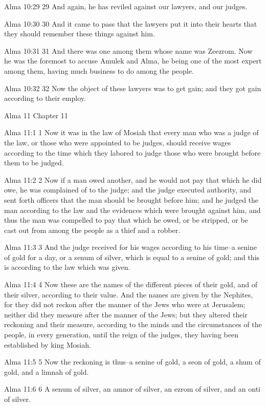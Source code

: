 Alma 10:29
 29 And again, he has reviled against our lawyers, and our
judges.

Alma 10:30
 30 And it came to pass that the lawyers put it into their hearts
that they should remember these things against him.

Alma 10:31
 31 And there was one among them whose name was Zeezrom. Now he
was the foremost to accuse Amulek and Alma, he being one of the
most expert among them, having much business to do among the
people.

Alma 10:32
 32 Now the object of these lawyers was to get gain; and they got
gain according to their employ.

Alma 11
Chapter 11

Alma 11:1
 1 Now it was in the law of Mosiah that every man who was a judge
of the law, or those who were appointed to be judges, should
receive wages according to the time which they labored to judge
those who were brought before them to be judged.

Alma 11:2
 2 Now if a man owed another, and he would not pay that which he
did owe, he was complained of to the judge; and the judge
executed authority, and sent forth officers that the man should
be brought before him; and he judged the man according to the law
and the evidences which were brought against him, and thus the
man was compelled to pay that which he owed, or be stripped, or
be cast out from among the people as a thief and a robber.

Alma 11:3
 3 And the judge received for his wages according to his time--a
senine of gold for a day, or a senum of silver, which is equal to
a senine of gold; and this is according to the law which was
given.

Alma 11:4
 4 Now these are the names of the different pieces of their gold,
and of their silver, according to their value. And the names are
given by the Nephites, for they did not reckon after the manner
of the Jews who were at Jerusalem; neither did they measure after
the manner of the Jews; but they altered their reckoning and
their measure, according to the minds and the circumstances of
the people, in every generation, until the reign of the judges,
they having been established by king Mosiah.

Alma 11:5
 5 Now the reckoning is thus--a senine of gold, a seon of gold, a
shum of gold, and a limnah of gold.

Alma 11:6
 6 A senum of silver, an amnor of silver, an ezrom of silver, and
an onti of silver.


